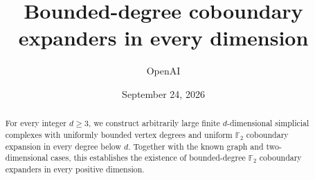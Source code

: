 \documentclass[11pt]{article}
\title{Bounded-degree coboundary expanders in every dimension}
\author{OpenAI}
\date{September 24, 2026}
\numberwithin{equation}{section}
\begin{document}
\maketitle
\begin{abstract}
For every integer $d\ge3$, we construct arbitrarily large finite
$d$-dimensional simplicial complexes with uniformly bounded vertex degrees
and uniform $\mathbb F_2$ coboundary expansion in every degree below $d$.
Together with the known graph and two-dimensional cases, this establishes
the existence of bounded-degree $\mathbb F_2$ coboundary expanders in every
positive dimension.
\end{abstract}






\end{document}
